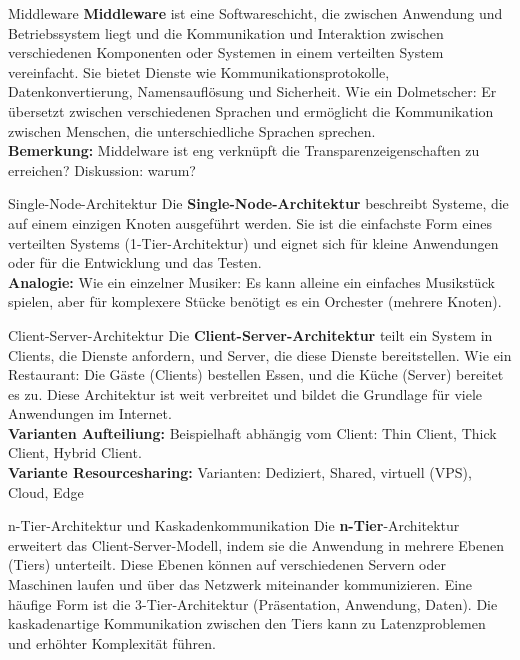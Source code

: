 \documentclass{beamer}
\begin{document}
\begin{frame}{Middleware}
    \textbf{Middleware} ist eine Softwareschicht, die zwischen Anwendung und Betriebssystem liegt und die Kommunikation und Interaktion zwischen verschiedenen Komponenten oder Systemen in einem verteilten System vereinfacht. Sie bietet Dienste wie Kommunikationsprotokolle, Datenkonvertierung, Namensauflösung und Sicherheit.  Wie ein Dolmetscher:  Er übersetzt zwischen verschiedenen Sprachen und ermöglicht die Kommunikation zwischen Menschen, die unterschiedliche Sprachen sprechen.
    \mbox{}\\
    \textbf{Bemerkung:} Middelware ist eng verknüpft die Transparenzeigenschaften zu erreichen? Diskussion: warum?
\end{frame}

\begin{frame}{Single-Node-Architektur}
    Die \textbf{Single-Node-Architektur} beschreibt Systeme, die auf einem einzigen Knoten ausgeführt werden.  Sie ist die einfachste Form eines verteilten Systems (1-Tier-Architektur) und eignet sich für kleine Anwendungen oder für die Entwicklung und das Testen.  
    \mbox{}\\
    \textbf{Analogie:}  Wie ein einzelner Musiker:  Es kann alleine ein einfaches Musikstück spielen, aber für komplexere Stücke benötigt es ein Orchester (mehrere Knoten).
\end{frame}


\begin{frame}{Client-Server-Architektur}
    Die \textbf{Client-Server-Architektur} teilt ein System in Clients, die Dienste anfordern, und Server, die diese Dienste bereitstellen.  Wie ein Restaurant:  Die Gäste (Clients) bestellen Essen, und die Küche (Server) bereitet es zu.  Diese Architektur ist weit verbreitet und bildet die Grundlage für viele Anwendungen im Internet.
    \mbox{}\\
    \textbf{Varianten Aufteiliung:} Beispielhaft abhängig vom Client: Thin Client, Thick Client, Hybrid Client.\\
    \textbf{Variante Resourcesharing:} Varianten: Dediziert, Shared, virtuell (VPS), Cloud, Edge 
\end{frame}

\begin{frame}{n-Tier-Architektur und Kaskadenkommunikation}
    Die \textbf{n-Tier}-Architektur erweitert das Client-Server-Modell, indem sie die Anwendung in mehrere Ebenen (Tiers) unterteilt. Diese Ebenen können auf verschiedenen Servern oder Maschinen laufen und über das Netzwerk miteinander kommunizieren. Eine häufige Form ist die 3-Tier-Architektur (Präsentation, Anwendung, Daten).  Die kaskadenartige Kommunikation zwischen den Tiers kann zu Latenzproblemen und erhöhter Komplexität führen.
\end{frame}
\end{document}
